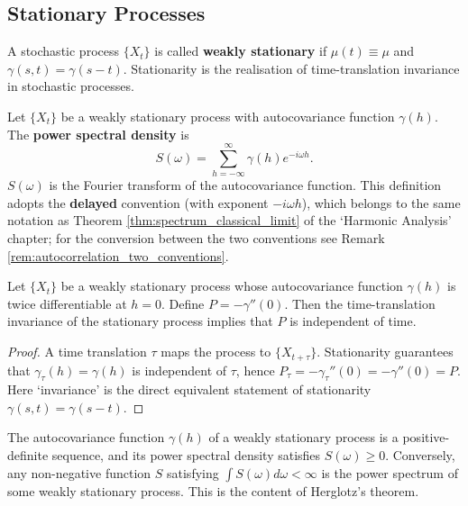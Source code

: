 \subsection{Stationary Processes}

\begin{definition}\label{def:stationary_process}
A stochastic process $\{X_t\}$ is called \textbf{weakly stationary} if $\mu(t) \equiv \mu$ and $\gamma(s, t) = \gamma(s-t)$. Stationarity is the realisation of time-translation invariance in stochastic processes.
\end{definition}

\begin{definition}\label{def:power_spectral_density}
Let $\{X_t\}$ be a weakly stationary process with autocovariance function $\gamma(h)$. The \textbf{power spectral density} is
\[
S(\omega) = \sum_{h=-\infty}^{\infty} \gamma(h) e^{-i\omega h}.
\]
$S(\omega)$ is the Fourier transform of the autocovariance function. This definition adopts the \textbf{delayed} convention (with exponent $-i\omega h$), which belongs to the same notation as Theorem \ref{thm:spectrum_classical_limit} of the `Harmonic Analysis' chapter; for the conversion between the two conventions see Remark \ref{rem:autocorrelation_two_conventions}.
\end{definition}

\begin{proposition}\label{ch14_autocovariance_stationarity}
Let $\{X_t\}$ be a weakly stationary process whose autocovariance function $\gamma(h)$ is twice differentiable at $h = 0$. Define $P = -\gamma''(0)$. Then the time-translation invariance of the stationary process implies that $P$ is independent of time.
\end{proposition}

\begin{proof}
A time translation $\tau$ maps the process to $\{X_{t+\tau}\}$. Stationarity guarantees that $\gamma_{\tau}(h) = \gamma(h)$ is independent of $\tau$, hence $P_{\tau} = -\gamma_{\tau}''(0) = -\gamma''(0) = P$. Here `invariance' is the direct equivalent statement of stationarity $\gamma(s, t) = \gamma(s - t)$.
\end{proof}

\begin{proposition}\label{prop:power_spectrum_positive}
The autocovariance function $\gamma(h)$ of a weakly stationary process is a positive-definite sequence, and its power spectral density satisfies $S(\omega) \ge 0$. Conversely, any non-negative function $S$ satisfying $\int S(\omega) d\omega < \infty$ is the power spectrum of some weakly stationary process. This is the content of Herglotz's theorem.
\end{proposition}

